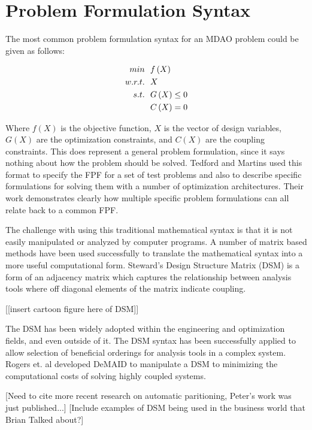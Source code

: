 \documentclass[]{aiaa-tc} %
\begin{document}
\section{Problem Formulation Syntax}
    The most common problem formulation syntax for an MDAO problem could be given as follows: 

    \begin{align}
        min &\ \ f\left(X\right) \notag
        \\ w.r.t. &\ \  X \notag
        \\ s.t. &\ \ G\left(X\right) \leq 0
        \\      &\ \ C\left(X\right) = 0
    \end{align}

    Where $f(X)$ is the objective function, $X$ is the vector of design variables, $G(X)$ are the optimization constraints, 
    and $C(X)$ are the coupling constraints. This does represent a general problem formulation, since it says nothing about 
    how the problem should be solved. Tedford and Martins used this format to specify the FPF for a set of test problems and 
    also to describe specific formulations for solving them with a number of optimization architectures\cite{Tedford2009}. Their
    work demonstrates clearly how multiple specific problem formulations can all relate back to a common FPF. 

    The challenge with using this traditional mathematical syntax is that it is not easily manipulated or analyzed by computer programs. 
    A number of matrix based methods have been used successfully to translate the mathematical syntax into a more useful computational form. 
    Steward's Design Structure Matrix (DSM) is a form of an adjacency matrix which captures the relationship between analysis tools where off 
    diagonal elements of the matrix indicate coupling\cite{Steward1981}. 

    [[insert cartoon figure here of DSM]]

    The DSM has been widely adopted within the engineering and optimization fields, and even outside of it. The DSM
    syntax has been successfully applied to allow selection of beneficial orderings for analysis 
    tools in a complex system. Rogers et. al developed DeMAID to manipulate a
    DSM to minimizing the computational costs of solving highly coupled systems\cite{Rogers1996}. 

    [Need to cite more recent research on automatic paritioning, Peter's work was just published...]
    [Include examples of DSM being used in the business world that Brian Talked about?]
\end{document}
